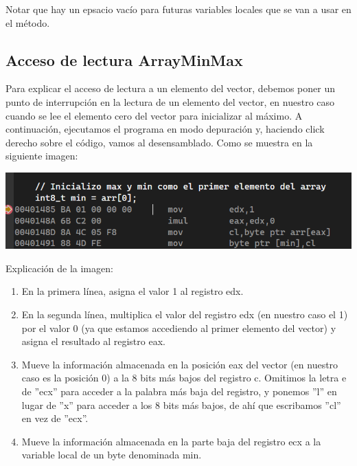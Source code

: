 \documentclass[11pt,a4paper]{article}
\begin{document}
\indent Notar que hay un epsacio vacío para futuras variables locales que se van a usar en el método.


\subsection{Acceso de lectura ArrayMinMax}
Para explicar el acceso de lectura a un elemento del vector, debemos poner un punto de interrupción en la lectura 
de un elemento del vector, en nuestro caso cuando se lee el elemento cero del vector para inicializar al máximo.
 A continuación, ejecutamos el programa en modo depuración y, haciendo click derecho sobre el código, vamos al desensamblado. Como se 
 muestra en la siguiente imagen:
 \vspace{1ex}
 \begin{center}
  \includegraphics[width=\textwidth]{VentanaDesensamblado.png}
 \end{center}
 \vspace{1ex}
 Explicación de la imagen:
 \begin{enumerate}
  \item En la primera línea, asigna el valor 1 al registro edx.
  \item En la segunda línea, multiplica el valor del registro edx (en nuestro caso el 1) por el valor 0 (ya que estamos accediendo al primer elemento del vector) y asigna el 
  resultado al registro eax.
  \vspace{3ex}

  \item Mueve la información almacenada en la posición eax del vector (en nuestro caso es la posición 0) a la 8 bits más bajos del registro c. Omitimos la letra e de ''ecx'' para acceder a la 
  palabra más baja del registro, y ponemos ''l'' en lugar de ''x'' para acceder a los 8 bits más bajos, de ahí que escribamos ''cl'' en vez de ''ecx''.
  \item Mueve la información almacenada en la parte baja del registro ecx a la variable local de un byte denominada min.
 \end{enumerate}

\newpage
\end{document}
